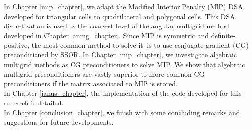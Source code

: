 \noindent In Chapter \ref{mip_chapter}, we adapt the Modified Interior 
Penalty (MIP) DSA developed for triangular cells to quadrilateral and polygonal 
cells. This DSA discretization is used as the coarsest level of the angular 
multigrid method developed in Chapter \ref{anmg_chapter}. Since MIP is
symmetric and definite-positive, the most common method to solve it, is to use
conjugate gradient (CG) preconditioned by SSOR. In Chapter \ref{mip_chapter}, we 
investigate algebraic multigrid methods as CG preconditioners to solve MIP. 
We show that algebraic multigrid preconditioners are vastly superior to more
common CG preconditioners if the matrix associated to MIP is stored.\\

\noindent In Chapter \ref{janus_chapter}, the implementation of the code
developed for this research is detailed.\\

\noindent In Chapter \ref{conclusion_chapter}, we finish with some concluding 
remarks and suggestions for future developments.
